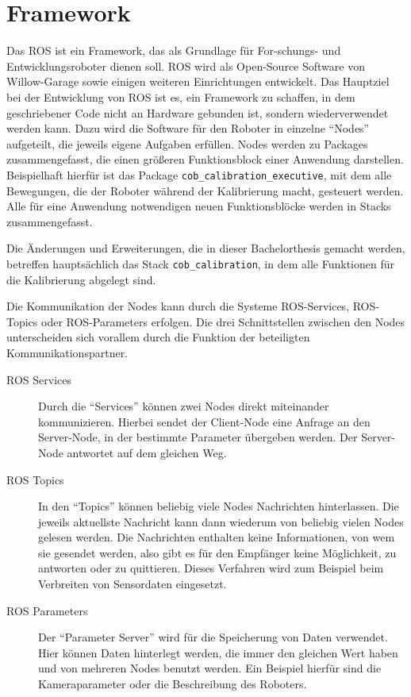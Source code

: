 \section{Framework}
\label{sec:ros}

Das \acf{ROS} ist ein Framework, das als Grundlage für For-\break schungs- und
Entwicklungsroboter dienen soll. \ac{ROS} wird als Open-Source Software von
Willow-Garage sowie einigen weiteren Einrichtungen entwickelt. Das Hauptziel bei
der Entwicklung von \ac{ROS} ist es, ein Framework zu schaffen, in dem
geschriebener Code nicht an Hardware gebunden ist, sondern wiederverwendet
werden kann. Dazu wird die Software für den Roboter in einzelne "`Nodes"'
aufgeteilt, die jeweils eigene Aufgaben erfüllen.
\newline Nodes werden zu Packages
zusammengefasst, die einen größeren Funktionsblock einer Anwendung darstellen.
Beispielhaft hierfür ist das Package \texttt{cob\_\allowbreak calibration\_\allowbreak executive}, mit
dem alle Bewegungen, die der Roboter während der Kalibrierung macht, gesteuert
werden.
\newline Alle für eine Anwendung notwendigen neuen Funktionsblöcke werden in
Stacks zusammengefasst. 

Die Änderungen und Erweiterungen, die in dieser
Bachelorthesis gemacht werden, betreffen hauptsächlich das Stack
\texttt{cob\_calibration}, in dem alle Funktionen für die Kalibrierung abgelegt
sind. 

Die Kommunikation der Nodes kann durch die Systeme \ac{ROS}-Services, \ac{ROS}-Topics 
oder \ac{ROS}-Parameters erfolgen.
Die drei Schnittstellen zwischen den Nodes unterscheiden sich vorallem
durch die Funktion der beteiligten Kommunikationspartner. 

\begin{description}

  \item[\ac{ROS} Services] Durch die "`Services"' können zwei Nodes direkt
    miteinander kommunizieren. Hierbei sendet der Client-Node eine Anfrage an
    den Server-Node, in der bestimmte Parameter übergeben werden. Der
    Server-Node antwortet auf dem gleichen Weg.

  \item[\ac{ROS} Topics]In den "`Topics"' können beliebig
    viele Nodes Nachrichten hinterlassen. Die jeweils aktuellste
    Nachricht kann dann wiederum von beliebig vielen Nodes gelesen werden. Die
    Nachrichten enthalten keine Informationen, von wem sie gesendet werden, also
    gibt es für den Empfänger keine Möglichkeit, zu antworten oder zu quittieren.
    Dieses Verfahren wird zum Beispiel beim Verbreiten von Sensordaten
    eingesetzt.

  \item[\ac{ROS} Parameters]Der "`Parameter Server"' wird für die
    Speicherung von Daten verwendet. Hier können Daten hinterlegt werden, die
    immer den gleichen Wert haben und von mehreren Nodes benutzt werden. Ein
    Beispiel hierfür sind die Kameraparameter oder die Beschreibung des
    Roboters. 

\end{description}

